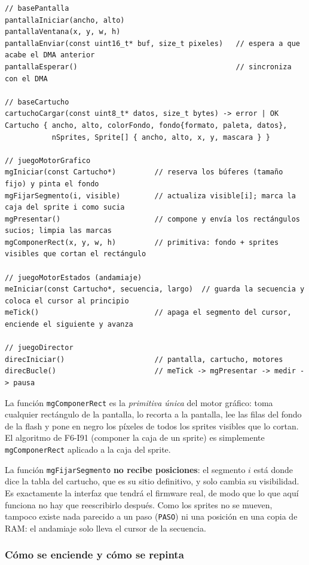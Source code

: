 \begin{verbatim}
// basePantalla
pantallaIniciar(ancho, alto)
pantallaVentana(x, y, w, h)
pantallaEnviar(const uint16_t* buf, size_t pixeles)   // espera a que acabe el DMA anterior
pantallaEsperar()                                     // sincroniza con el DMA

// baseCartucho
cartuchoCargar(const uint8_t* datos, size_t bytes) -> error | OK
Cartucho { ancho, alto, colorFondo, fondo{formato, paleta, datos},
           nSprites, Sprite[] { ancho, alto, x, y, mascara } }

// juegoMotorGrafico
mgIniciar(const Cartucho*)         // reserva los búferes (tamaño fijo) y pinta el fondo
mgFijarSegmento(i, visible)        // actualiza visible[i]; marca la caja del sprite i como sucia
mgPresentar()                      // compone y envía los rectángulos sucios; limpia las marcas
mgComponerRect(x, y, w, h)         // primitiva: fondo + sprites visibles que cortan el rectángulo

// juegoMotorEstados (andamiaje)
meIniciar(const Cartucho*, secuencia, largo)  // guarda la secuencia y coloca el cursor al principio
meTick()                           // apaga el segmento del cursor, enciende el siguiente y avanza

// juegoDirector
direcIniciar()                     // pantalla, cartucho, motores
direcBucle()                       // meTick -> mgPresentar -> medir -> pausa
\end{verbatim}

La función \texttt{mgComponerRect} es la \emph{primitiva única} del motor gráfico: toma cualquier rectángulo de la pantalla, lo recorta a la pantalla, lee las filas del fondo de la flash y pone en negro los píxeles de todos los sprites visibles que lo cortan. El algoritmo de F6-I91 (componer la caja de un sprite) es simplemente \texttt{mgComponerRect} aplicado a la caja del sprite.

La función \texttt{mgFijarSegmento} \textbf{no recibe posiciones}: el segmento $i$ está donde dice la tabla del cartucho, que es su sitio definitivo, y solo cambia su visibilidad. Es exactamente la interfaz que tendrá el firmware real, de modo que lo que aquí funciona no hay que reescribirlo después. Como los sprites no se mueven, tampoco existe nada parecido a un paso (\texttt{PASO}) ni una posición en una copia de RAM: el andamiaje solo lleva el cursor de la secuencia.

\subsubsection{Cómo se enciende y cómo se repinta}


